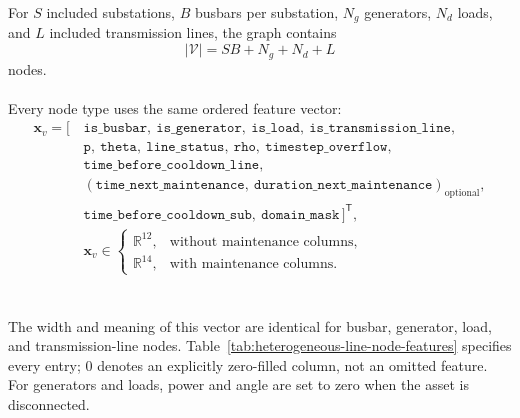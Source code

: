For $S$ included substations, $B$ busbars per substation, $N_g$ generators,
$N_d$ loads, and $L$ included transmission lines, the graph contains
\begin{equation}
  |\mathcal{V}| = SB + N_g + N_d + L
  \label{eq:heterogeneous-line-node-count}
\end{equation}
nodes.
\\
\\
Every node type uses the same ordered feature vector:
\begin{equation}
  \begin{split}
  \mathbf{x}_v = [\,&
  \texttt{is\_busbar},\
  \texttt{is\_generator},\
  \texttt{is\_load},\
  \texttt{is\_transmission\_line},\\
  &\texttt{p},\
  \texttt{theta},\
  \texttt{line\_status},\
  \texttt{rho},\
  \texttt{timestep\_overflow},\\
  &\texttt{time\_before\_cooldown\_line},\\
  &(\texttt{time\_next\_maintenance},\
  \texttt{duration\_next\_maintenance})_{\mathrm{optional}},\\
  &\texttt{time\_before\_cooldown\_sub},\
  \texttt{domain\_mask}
  \,]^{\mathsf T},\\
  &\mathbf{x}_v \in
  \begin{cases}
    \mathbb{R}^{12}, & \text{without maintenance columns},\\
    \mathbb{R}^{14}, & \text{with maintenance columns}.
  \end{cases}
  \end{split}
  \label{eq:heterogeneous-line-common-node-vector}
\end{equation}
\\
\\
The width and meaning of this vector are identical for busbar, generator, load, and
transmission-line nodes. Table~\ref{tab:heterogeneous-line-node-features}
specifies every entry; \(0\) denotes an explicitly zero-filled column, not an
omitted feature. For generators and loads, power and angle are set to zero when
the asset is disconnected.

